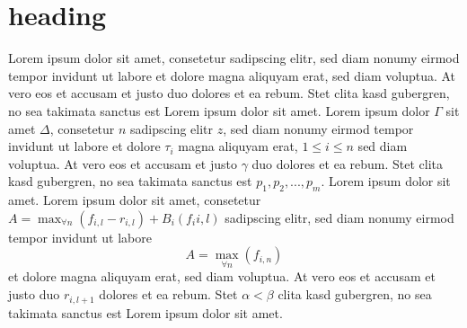 \section{heading}\label{mylabel}
Lorem ipsum dolor sit amet, consetetur sadipscing elitr, sed diam nonumy eirmod tempor invidunt ut labore et dolore magna aliquyam erat, sed diam voluptua. At
vero eos et accusam et justo duo dolores et ea rebum. Stet clita kasd gubergren, no sea takimata sanctus est Lorem ipsum dolor sit amet. Lorem ipsum
dolor $\Gamma$ sit amet $\Delta$, consetetur $n$ sadipscing elitr $z$, sed diam nonumy eirmod tempor invidunt ut labore et dolore $\tau_i$ magna aliquyam erat, $1 \leq i \leq n$ sed diam
voluptua. At vero eos et accusam et justo $\gamma$ duo dolores et ea rebum. Stet clita kasd gubergren, no sea takimata sanctus est
$p_1,p_2,...,p_m$. Lorem ipsum  dolor sit amet. Lorem ipsum dolor sit amet, consetetur $A=\max_{\forall n}(f_{i,l}-r_{i,l}) + B_i(f_i{i,l})$ sadipscing elitr, sed diam nonumy eirmod
tempor invidunt ut labore \[A=\max_{\forall n}(f_{i,n})\] et dolore magna aliquyam erat, sed diam voluptua. At vero eos et accusam et justo duo $r_{i,l+1}$
dolores et ea rebum. Stet $\alpha < \beta$ clita kasd gubergren, no sea takimata sanctus est Lorem ipsum dolor sit amet.
